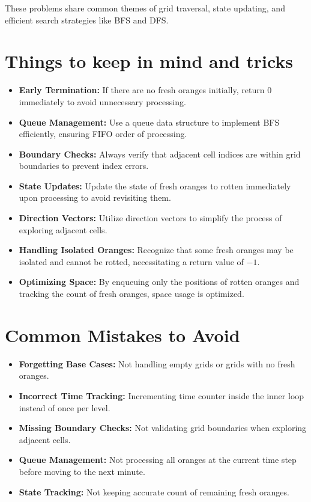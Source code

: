 These problems share common themes of grid traversal, state updating, and efficient search strategies like BFS and DFS.

\section*{Things to keep in mind and tricks}

\begin{itemize}
    \item \textbf{Early Termination:} If there are no fresh oranges initially, return \(0\) immediately to avoid unnecessary processing.
    
    \item \textbf{Queue Management:} Use a queue data structure to implement BFS efficiently, ensuring FIFO order of processing.
    
    \item \textbf{Boundary Checks:} Always verify that adjacent cell indices are within grid boundaries to prevent index errors.
    
    \item \textbf{State Updates:} Update the state of fresh oranges to rotten immediately upon processing to avoid revisiting them.
    
    \item \textbf{Direction Vectors:} Utilize direction vectors to simplify the process of exploring adjacent cells.
    
    \item \textbf{Handling Isolated Oranges:} Recognize that some fresh oranges may be isolated and cannot be rotted, necessitating a return value of \(-1\).
    
    \item \textbf{Optimizing Space:} By enqueuing only the positions of rotten oranges and tracking the count of fresh oranges, space usage is optimized.
\end{itemize}

\section*{Common Mistakes to Avoid}
\begin{itemize}
    \item \textbf{Forgetting Base Cases:} Not handling empty grids or grids with no fresh oranges.
    \item \textbf{Incorrect Time Tracking:} Incrementing time counter inside the inner loop instead of once per level.
    \item \textbf{Missing Boundary Checks:} Not validating grid boundaries when exploring adjacent cells.
    \item \textbf{Queue Management:} Not processing all oranges at the current time step before moving to the next minute.
    \item \textbf{State Tracking:} Not keeping accurate count of remaining fresh oranges.
\end{itemize}

